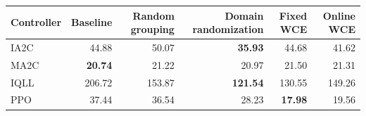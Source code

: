 \begin{tabular}{lrrrrr}
\hline
Controller & Baseline & Random grouping & Domain randomization & Fixed WCE & Online WCE \\
\hline
IA2C & 44.88 & 50.07 & \textbf{35.93} & 44.68 & 41.62 \\
MA2C & \textbf{20.74} & 21.22 & 20.97 & 21.50 & 21.31 \\
IQLL & 206.72 & 153.87 & \textbf{121.54} & 130.55 & 149.26 \\
PPO & 37.44 & 36.54 & 28.23 & \textbf{17.98} & 19.56 \\
\hline
\end{tabular}
